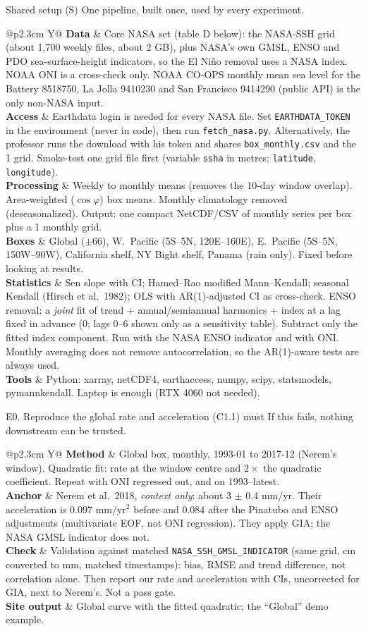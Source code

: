 \documentclass[10pt]{article}
\makeatletter
\newcommand{\row}[2]{\textbf{\sffamily\footnotesize #1} & #2\\}
\newcommand{\card}[1]{\begin{nubox}[]\begin{tabularx}{\linewidth}{@{}p{2.3cm} Y@{}}#1\end{tabularx}\end{nubox}}
\makeatother
\begin{document}
\begin{expbox}{Shared setup (S)}
One pipeline, built once, used by every experiment.
\end{expbox}
\card{
\row{Data}{Core NASA set (table D below): the NASA-SSH grid (about 1{,}700 weekly files, about 2 GB), plus NASA's own GMSL, ENSO and PDO
sea-surface-height indicators, so the El Ni\~no removal uses a NASA index. NOAA ONI is a cross-check only. NOAA CO-OPS monthly mean sea level for the
Battery 8518750, La Jolla 9410230 and San Francisco 9414290 (public API) is the only non-NASA input.}
\row{Access}{Earthdata login is needed for every NASA file. Set \texttt{EARTHDATA\_TOKEN} in the environment (never in code), then run
\texttt{fetch\_nasa.py}. Alternatively, the professor runs the download with his token and shares \texttt{box\_monthly.csv} and the 1\textdegree{}
grid. Smoke-test one grid file first (variable \texttt{ssha} in metres; \texttt{latitude}, \texttt{longitude}).}
\row{Processing}{Weekly to monthly means (removes the 10-day window overlap). Area-weighted ($\cos\varphi$) box means.
Monthly climatology removed (deseasonalized). Output: one compact NetCDF/CSV of monthly series per box plus a 1\textdegree{} monthly grid.}
\row{Boxes}{Global ($\pm66$\textdegree), W.\ Pacific (5\textdegree S--5\textdegree N, 120\textdegree E--160\textdegree E), E.\ Pacific
(5\textdegree S--5\textdegree N, 150\textdegree W--90\textdegree W), California shelf, NY Bight shelf, Panama (rain only). Fixed
before looking at results.}
\row{Statistics}{Sen slope with CI; Hamed--Rao modified Mann--Kendall; seasonal Kendall (Hirsch et al.\ 1982); OLS with AR(1)-adjusted
CI as cross-check. ENSO removal: a \emph{joint} fit of trend + annual/semiannual harmonics + index at a lag fixed in advance (0; lags 0--6
shown only as a sensitivity table). Subtract only the fitted index component. Run with the NASA ENSO indicator and with ONI. Monthly
averaging does not remove autocorrelation, so the AR(1)-aware tests are always used.}
\row{Tools}{Python: xarray, netCDF4, earthaccess, numpy, scipy, statsmodels, pymannkendall. Laptop is enough (RTX 4060 not needed).}
}

\begin{expbox}{E0. Reproduce the global rate and acceleration (C1.1) \hfill must}
If this fails, nothing downstream can be trusted.
\end{expbox}
\card{
\row{Method}{Global box, monthly, 1993-01 to 2017-12 (Nerem's window). Quadratic fit: rate at the window centre and $2\times$ the quadratic
coefficient. Repeat with ONI regressed out, and on 1993--latest.}
\row{Anchor}{Nerem et al.\ 2018, \emph{context only}: about 3 $\pm$ 0.4 mm/yr. Their acceleration is 0.097 mm/yr$^2$ before and 0.084 after
the Pinatubo and ENSO adjustments (multivariate EOF, not ONI regression). They apply GIA; the NASA GMSL indicator does not.}
\row{Check}{Validation against matched \texttt{NASA\_SSH\_GMSL\_INDICATOR} (same grid, cm converted to mm, matched timestamps): bias, RMSE and
trend difference, not correlation alone. Then report our rate and acceleration with CIs, uncorrected for GIA, next to Nerem's. Not a pass gate.}
\row{Site output}{Global curve with the fitted quadratic; the ``Global'' demo example.}
}
\end{document}
